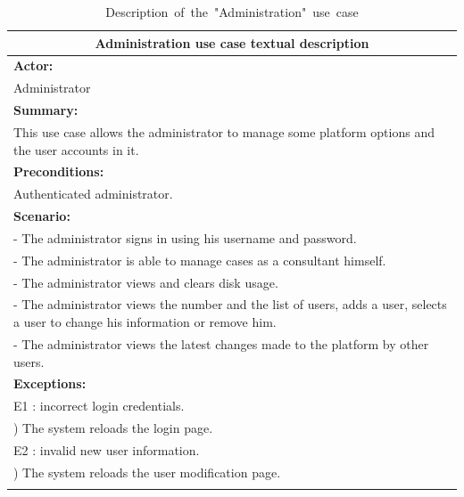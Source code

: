 \newpage
\begin{longtable}{|p{15cm}|}
\hline
\multicolumn{1}{|c|}{\textbf{Administration use case textual description}}\\
\hline
\multicolumn{1}{|l|}{\textbf{Actor:} } \\
\quad Administrator \\
\multicolumn{1}{|l|}{\textbf{Summary:} } \\
\quad This use case allows the administrator to manage some platform options and the user accounts in it.\\
\multicolumn{1}{|l|}{\textbf{Preconditions:} }\\
\quad Authenticated administrator.\\
\multicolumn{1}{|l|}{\textbf{Scenario:}} \\
\quad - The administrator signs in using his username and password. \\
\quad - The administrator is able to manage cases as a consultant himself. \\
\quad - The administrator views and clears disk usage. \\
\quad - The administrator views the number and the list of users, adds a user, selects a user to change his information or remove him. \\
\quad - The administrator views the latest changes made to the platform by other users. \\
\multicolumn{1}{|l|}{\textbf{Exceptions:}} \\
\quad E1 : incorrect login credentials.\\
\quad 1) The system reloads the login page.\\
\quad E2 : invalid new user information.\\
\quad 2) The system reloads the user modification page.\\
\hline
\caption{\mbox{Description of the "Administration" use case}}
\end{longtable}

